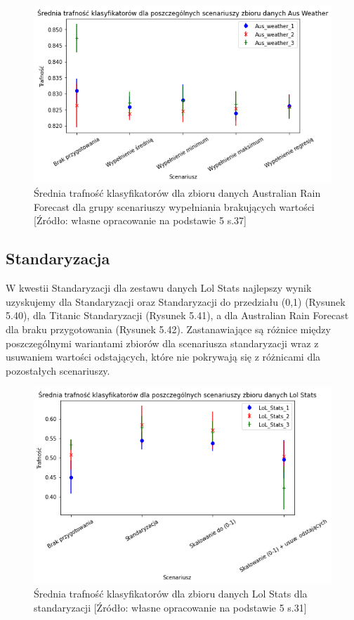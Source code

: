 \documentclass[oneside]{book}
\begin{document}
\begin{figure}[H]
    \centerline{\includegraphics[scale=0.8]{Aus_Weather_Avg_Wypełnienie_brakujących}}
    \centering
    \caption{Średnia trafność klasyfikatorów dla zbioru danych Australian Rain Forecast 
    dla grupy scenariuszy wypełniania brakujących wartości
    [Źródło: własne opracowanie na podstawie 5 s.37]}
    \end{figure}



\subsection{Standaryzacja}

W kwestii Standaryzacji dla zestawu danych Lol Stats 
najlepszy wynik uzyskujemy dla Standaryzacji oraz 
Standaryzacji do przedziału (0,1) (Rysunek 5.40), dla 
Titanic Standaryzacji (Rysunek 5.41), a dla Australian 
Rain Forecast dla braku przygotowania (Rysunek 5.42).
Zastanawiające są różnice między poszczególnymi wariantami zbiorów dla scenariusza
standaryzacji wraz z usuwaniem wartości odstających, 
które nie pokrywają się z różnicami 
dla pozostałych scenariuszy.

\begin{figure}[H]
    \centerline{\includegraphics[scale=0.8]{Lol_Stats_Avg_Standaryzacja}}
    \centering
    \caption{Średnia trafność klasyfikatorów dla zbioru danych Lol Stats 
    dla standaryzacji
    [Źródło: własne opracowanie na podstawie 5 s.31]}
    \end{figure}
\end{document}
